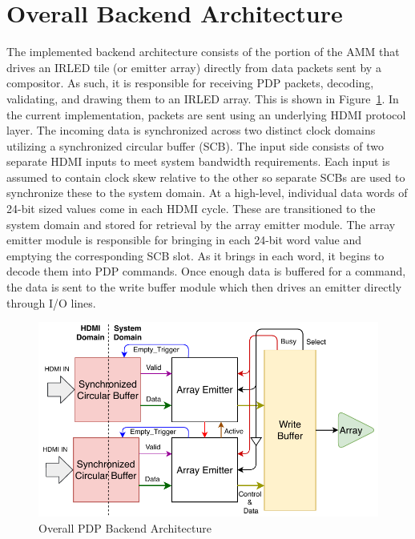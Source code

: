\section{Overall Backend Architecture}
    \label{sec:backend_arch}
    The implemented backend architecture consists of the portion of the AMM that drives an IRLED tile (or emitter array) directly from data packets sent by a compositor. As such, it is responsible for receiving PDP packets, decoding, validating, and drawing them to an IRLED array. This is shown in Figure~\ref{fig:overall_arch}. In the current implementation, packets are sent using an underlying HDMI protocol layer. The incoming data is synchronized across two distinct clock domains utilizing a synchronized circular buffer (SCB). The input side consists of two separate HDMI inputs to meet system bandwidth requirements. Each input is assumed to contain clock skew relative to the other so separate SCBs are used to synchronize these to the system domain. At a high-level, individual data words of 24-bit sized values come in each HDMI cycle. These are transitioned to the system domain and stored for retrieval by the array emitter module. The array emitter module is responsible for bringing in each 24-bit word value and emptying the corresponding SCB slot. As it brings in each word, it begins to decode them into PDP commands. Once enough data is buffered for a command, the data is sent to the write buffer module which then drives an emitter directly through I/O lines.

    \begin{figure}
        \centering
        \includegraphics[width=1.0\textwidth]{fig/pdp_overall_arch.pdf}
        \caption{Overall PDP Backend Architecture}
        \label{fig:overall_arch}
    \end{figure}

